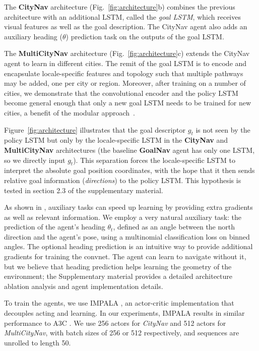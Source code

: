 The {\bf CityNav} architecture (Fig.~\ref{fig:architecture}b) combines the previous architecture with an additional LSTM, called the \emph{goal LSTM}, which receives visual features as well as the goal description.  The CityNav agent also adds an auxiliary heading ($\theta$)  prediction task on the outputs of the goal LSTM.
    
The {\bf MultiCityNav} architecture (Fig.~\ref{fig:architecture}c) extends the CityNav agent to learn in different cities. The remit of the goal LSTM is to encode and encapsulate locale-specific features and topology such that multiple pathways may be added, one per city or region. Moreover, after training on a number of cities, we demonstrate that the convolutional encoder and the policy LSTM become general enough that only a new goal LSTM needs to be trained for new cities, a benefit of the modular approach~\cite{devin2017learning}. 

Figure~\ref{fig:architecture} illustrates that the goal descriptor $g_t$ is not seen by the policy LSTM but only by the locale-specific LSTM in the {\bf CityNav} and {\bf MultiCityNav} architectures (the baseline {\bf GoalNav} agent has only one LSTM, so we directly input $g_t$). This separation forces the locale-specific LSTM to interpret the absolute goal position coordinates, with the hope that it then sends relative goal information (\emph{directions}) to the policy LSTM. This hypothesis is tested in section 2.3 of the supplementary material.

As shown in \cite{jaderberg2016reinforcement,mirowski2016learning,dosovitskiy2016learning,lample_aaai17}, auxiliary tasks can speed up learning by providing extra gradients as well as relevant information. We employ a very natural auxiliary task: the prediction of the agent's heading $\theta_t$, defined as an angle between the north direction and the agent's pose, using a multinomial classification loss on binned angles. The optional heading prediction is an intuitive way to provide additional gradients for training the convnet. The agent can learn to navigate without it, but we believe that heading prediction helps learning the geometry of the environment; the Supplementary material provides a detailed architecture ablation analysis and agent implementation details.

To train the agents, we use IMPALA \cite{espeholt2018impala}, an actor-critic implementation that decouples acting and learning. In our experiments, IMPALA results in similar performance to A3C \cite{mnih2016asynchronous}. We use 256 actors for \emph{CityNav} and 512 actors for \emph{MultiCityNav}, with batch sizes of 256 or 512 respectively, and sequences are unrolled to length 50. 



